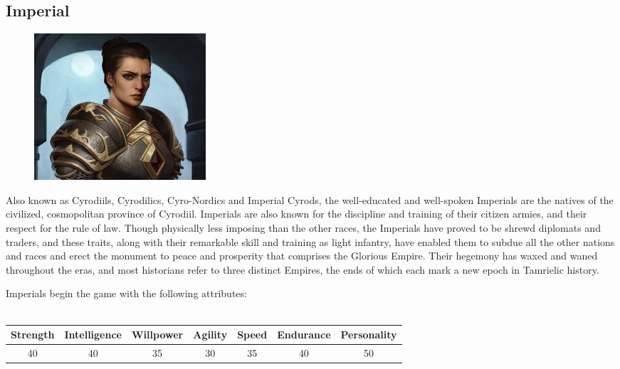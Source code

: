 \documentclass[12pt]{book}
\begin{document}
\subsection{Imperial}
\begin{figure}
	\includegraphics[width=\textwidth]{Imperial.png}
\end{figure}

Also known as Cyrodiils, Cyrodilics, Cyro-Nordics and Imperial Cyrods, the well-educated and well-spoken Imperials are the natives of the civilized, cosmopolitan province of Cyrodiil. Imperials are also known for the discipline and training of their citizen armies, and their respect for the rule of law. Though physically less imposing than the other races, the Imperials have proved to be shrewd diplomats and traders, and these traits, along with their remarkable skill and training as light infantry, have enabled them to subdue all the other nations and races and erect the monument to peace and prosperity that comprises the Glorious Empire. Their hegemony has waxed and waned throughout the eras, and most historians refer to three distinct Empires, the ends of which each mark a new epoch in Tamrielic history.

Imperials begin the game with the following attributes:\\~\\
\begin{tabular}{|c|c|c|c|c|c|c|}
\hline
Strength & Intelligence & Willpower & Agility & Speed & Endurance & Personality\\ \hline
40 & 40 & 35 & 30 & 35 & 40 & 50\\ \hline

\end{tabular}\\
\end{document}
